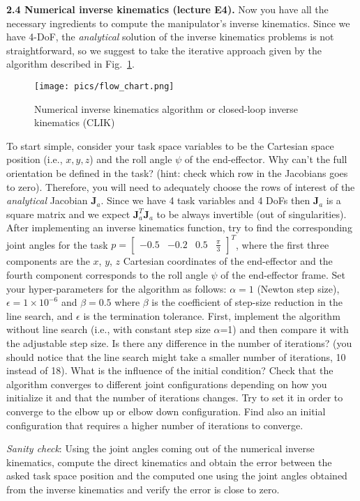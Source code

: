 \documentclass[11pt]{article}
\newcommand{\mat}[1]{\ensuremath{\begin{bmatrix}#1\end{bmatrix}}}	%
\begin{document}
\textbf{2.4 Numerical inverse kinematics (lecture E4).} Now you have all the necessary ingredients to compute the manipulator's inverse kinematics. Since we have 4-DoF, the \textit{analytical} solution of the inverse kinematics problems is not straightforward, so we suggest to take the iterative approach given by the algorithm described in Fig.~\ref{fig:CLIK}.  
%
\begin{figure}[bht]
	\centering
	\texttt{[image: pics/flow\_chart.png]}
	\caption{Numerical inverse kinematics algorithm or closed-loop inverse kinematics (CLIK)}
	\label{fig:CLIK}
\end{figure}
%
To start simple, consider your task space variables to be the Cartesian space position (i.e., $x,y,z$) and the roll angle $\psi$ of the end-effector. 
Why can't the full orientation be defined in the task? (hint: check which row in the Jacobians goes to zero). 
Therefore, you will need to adequately choose the rows of interest of the \textit{analytical} Jacobian $\mathbf{J}_a$. 
Since we have 4 task variables and 4 DoFs then   $\mathbf{J}_a$ is a square matrix and we expect $\mathbf{J}_a^T\mathbf{J}_a$ to be always invertible (out of singularities).  After implementing an inverse kinematics function, try to find the corresponding joint angles for the task $p = \mat{-0.5 & -0.2 & 0.5 & \frac{\pi}{3}}^T$, where the first three components are the $x$, $y$, $z$ Cartesian coordinates of the end-effector and the fourth component corresponds to the roll angle $\psi$ of the end-effector frame. Set your hyper-parameters for the algorithm as follows: $\alpha = 1$ (Newton step  size), $\epsilon = 1 \times 10^{-6}$ and $\beta = 0.5$ where $\beta$ is the coefficient of step-size reduction in the line search, and $\epsilon$ is the termination tolerance. 
First, implement the algorithm without line search (i.e., with constant step size $\alpha$=1) and then compare it with the adjustable step size. Is there any difference in the number of iterations?  (you should notice that the line search might take a smaller number of iterations, 10 instead of 18). What is the influence of the initial condition? 
Check that the algorithm converges to different joint configurations depending on how you initialize it and that the number of iterations changes. 
Try to set it in order to converge to the elbow up or elbow down configuration. Find also an initial configuration that requires a higher number of iterations to converge.

\textit{Sanity check}: Using the joint angles coming out of the numerical inverse kinematics, compute the direct kinematics and obtain the error between the asked task space position and the computed one using the joint angles obtained from the inverse kinematics and verify the error is close to zero.  
 
\end{document}
